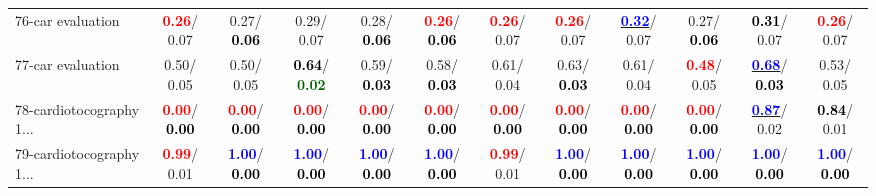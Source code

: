 \begin{table}[h]
\begin{center}
{\begin{tabular}{lc|c|c|c|c|c|c|c|c|c|c}
76-car evaluation & \textcolor{red}{\textbf{  0.26}}/  0.07 &   0.27/\textcolor{black}{\textbf{  0.06}} &   0.29/  0.07 &   0.28/\textcolor{black}{\textbf{  0.06}} & \textcolor{red}{\textbf{  0.26}}/\textcolor{black}{\textbf{  0.06}} & \textcolor{red}{\textbf{  0.26}}/  0.07 & \textcolor{red}{\textbf{  0.26}}/  0.07 & \underline{\textcolor{blue}{\textbf{  0.32}}}/  0.07 &   0.27/\textcolor{black}{\textbf{  0.06}} & \textcolor{black}{\textbf{  0.31}}/  0.07 & \textcolor{red}{\textbf{  0.26}}/  0.07 \\
77-car evaluation &   0.50/  0.05 &   0.50/  0.05 & \textcolor{black}{\textbf{  0.64}}/\textcolor{darkgreen}{\textbf{  0.02}} &   0.59/\textcolor{black}{\textbf{  0.03}} &   0.58/\textcolor{black}{\textbf{  0.03}} &   0.61/  0.04 &   0.63/\textcolor{black}{\textbf{  0.03}} &   0.61/  0.04 & \textcolor{red}{\textbf{  0.48}}/  0.05 & \underline{\textcolor{blue}{\textbf{  0.68}}}/\textcolor{black}{\textbf{  0.03}} &   0.53/  0.05 \\
78-cardiotocography 1... & \textcolor{red}{\textbf{  0.00}}/\textcolor{black}{\textbf{  0.00}} & \textcolor{red}{\textbf{  0.00}}/\textcolor{black}{\textbf{  0.00}} & \textcolor{red}{\textbf{  0.00}}/\textcolor{black}{\textbf{  0.00}} & \textcolor{red}{\textbf{  0.00}}/\textcolor{black}{\textbf{  0.00}} & \textcolor{red}{\textbf{  0.00}}/\textcolor{black}{\textbf{  0.00}} & \textcolor{red}{\textbf{  0.00}}/\textcolor{black}{\textbf{  0.00}} & \textcolor{red}{\textbf{  0.00}}/\textcolor{black}{\textbf{  0.00}} & \textcolor{red}{\textbf{  0.00}}/\textcolor{black}{\textbf{  0.00}} & \textcolor{red}{\textbf{  0.00}}/\textcolor{black}{\textbf{  0.00}} & \underline{\textcolor{blue}{\textbf{  0.87}}}/  0.02 & \textcolor{black}{\textbf{  0.84}}/  0.01 \\ \hline
79-cardiotocography 1... & \textcolor{red}{\textbf{  0.99}}/  0.01 & \textcolor{blue}{\textbf{  1.00}}/\textcolor{black}{\textbf{  0.00}} & \textcolor{blue}{\textbf{  1.00}}/\textcolor{black}{\textbf{  0.00}} & \textcolor{blue}{\textbf{  1.00}}/\textcolor{black}{\textbf{  0.00}} & \textcolor{blue}{\textbf{  1.00}}/\textcolor{black}{\textbf{  0.00}} & \textcolor{red}{\textbf{  0.99}}/  0.01 & \textcolor{blue}{\textbf{  1.00}}/\textcolor{black}{\textbf{  0.00}} & \textcolor{blue}{\textbf{  1.00}}/\textcolor{black}{\textbf{  0.00}} & \textcolor{blue}{\textbf{  1.00}}/\textcolor{black}{\textbf{  0.00}} & \textcolor{blue}{\textbf{  1.00}}/\textcolor{black}{\textbf{  0.00}} & \textcolor{blue}{\textbf{  1.00}}/\textcolor{black}{\textbf{  0.00}} \\

\end{tabular}}
\end{center}
\end{table}
